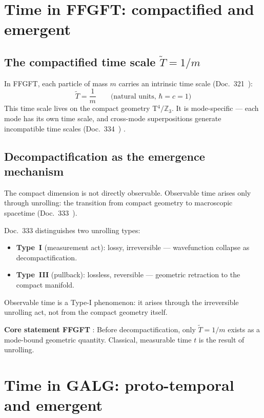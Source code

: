 \section{Time in FFGFT: compactified and emergent}

\subsection{The compactified time scale $\tilde{T} = 1/m$}

In FFGFT, each particle of mass $m$ carries an intrinsic
time scale (Doc.~321~\cite{Pascher321}):
\begin{equation}
  \tilde{T} = \frac{1}{m}
  \qquad \text{(natural units, $\hbar = c = 1$)}
\end{equation}
This time scale lives on the compact geometry T$^4/\mathbb{Z}_3$.
It is mode-specific --- each mode has its own time scale,
and cross-mode superpositions generate incompatible time scales
(Doc.~334~\cite{Pascher334}) \BM.

\subsection{Decompactification as the emergence mechanism}

The compact dimension is not directly observable.
Observable time arises only through unrolling:
the transition from compact geometry to macroscopic spacetime
(Doc.~333~\cite{Pascher333}).

Doc.~333 distinguishes two unrolling types:
\begin{itemize}
  \item \textbf{Type~I} (measurement act): lossy, irreversible ---
    wavefunction collapse as decompactification.
  \item \textbf{Type~III} (pullback): lossless, reversible ---
    geometric retraction to the compact manifold.
\end{itemize}
Observable time is a Type-I phenomenon: it arises through
the irreversible unrolling act, not from the compact geometry itself.

\textbf{Core statement FFGFT} \BM:
Before decompactification, only $\tilde{T} = 1/m$ exists
as a mode-bound geometric quantity.
Classical, measurable time $t$ is the result of unrolling.

\section{Time in GALG: proto-temporal and emergent}

